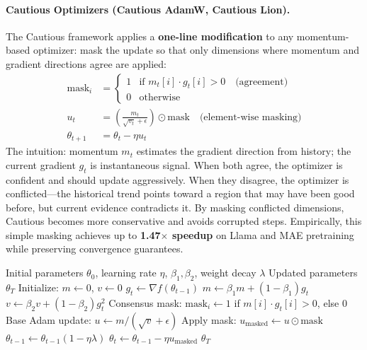 \paragraph{Cautious Optimizers (Cautious AdamW, Cautious Lion).}
The Cautious framework applies a \textbf{one-line modification} to any momentum-based optimizer: mask the update so that only dimensions where momentum and gradient directions agree are applied:
\begin{align}
\text{mask}_i &= \begin{cases} 1 & \text{if } m_t[i] \cdot g_t[i] > 0 \quad\text{(agreement)} \\ 0 & \text{otherwise} \end{cases} \\
u_t &= \left(\frac{m_t}{\sqrt{v_t}+\epsilon}\right) \odot \text{mask} \quad\text{(element-wise masking)} \\
\theta_{t+1} &= \theta_t - \eta u_t
\end{align}
The intuition: momentum $m_t$ estimates the gradient direction from history; the current gradient $g_t$ is instantaneous signal. When both agree, the optimizer is confident and should update aggressively. When they disagree, the optimizer is conflicted---the historical trend points toward a region that may have been good before, but current evidence contradicts it. By masking conflicted dimensions, Cautious becomes more conservative and avoids corrupted steps. Empirically, this simple masking achieves up to \textbf{1.47$\times$ speedup} on Llama and MAE pretraining while preserving convergence guarantees.

\begin{algorithm}[H]
\caption{Cautious AdamW (Consensus-based Update Masking)}
\label{alg:cautious}
\begin{algorithmic}[1]
\Require Initial parameters $\theta_0$, learning rate $\eta$, $\beta_1, \beta_2$, weight decay $\lambda$
\Ensure Updated parameters $\theta_T$
\State Initialize: $m \gets 0$, $v \gets 0$
    \State $g_t \gets \nabla f(\theta_{t-1})$
    \State $m \gets \beta_1 m + (1-\beta_1) g_t$
    \State $v \gets \beta_2 v + (1-\beta_2) g_t^2$
    \State Consensus mask: $\text{mask}_i \gets 1$ if $m[i] \cdot g_t[i] > 0$, else $0$ 
    \State Base Adam update: $u \gets m / (\sqrt{v} + \epsilon)$
    \State Apply mask: $u_{\text{masked}} \gets u \odot \text{mask}$ 
        \State $\theta_{t-1} \gets \theta_{t-1}(1 - \eta\lambda)$
    \EndIf
    \State $\theta_t \gets \theta_{t-1} - \eta u_{\text{masked}}$
\EndFor
\Return $\theta_T$
\end{algorithmic}
\end{algorithm}

